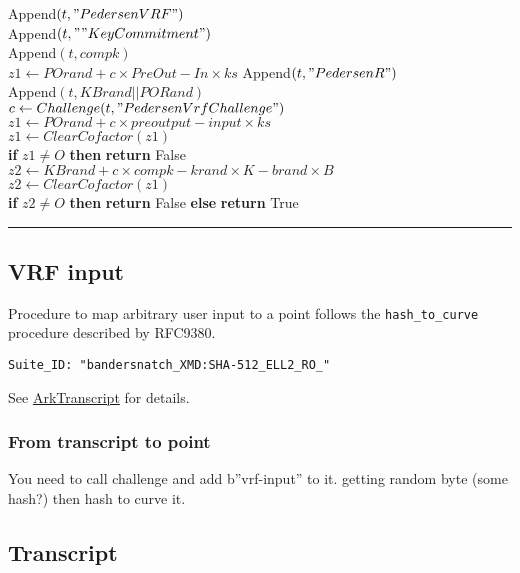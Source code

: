 \documentclass[
]{article}
\begin{document}
Append\((t, "PedersenVRF")\)\\
Append\((t, ""KeyCommitment")\)\\
Append\((t, compk)\)\\
\(z1 \leftarrow POrand + c \times PreOut - In \times ks\)
Append\((t, "Pedersen R")\)\\
Append\((t, KBrand || PORand)\)\\
\(c \leftarrow Challenge(t, "PedersenVrfChallenge")\)\\
\(z1 \leftarrow POrand + c \times preoutput - input \times ks\)\\
\(z1 \leftarrow ClearCofactor(z1)\)\\
\textbf{if} \(z1 \neq O\) \textbf{then} \textbf{return} False\\
\(z2 \leftarrow KBrand + c \times compk - krand \times K - brand \times B\)\\
\(z2 \leftarrow ClearCofactor(z1)\)\\
\textbf{if} \(z2 \neq O\) \textbf{then} \textbf{return} False
\textbf{else} \textbf{return} True

\begin{center}\rule{0.5\linewidth}{0.5pt}\end{center}

\hypertarget{vrf-input-1}{%
\subsection{VRF input}\label{vrf-input-1}}

Procedure to map arbitrary user input to a point follows the
\texttt{hash\_to\_curve} procedure described by RFC9380.

\begin{verbatim}
Suite_ID: "bandersnatch_XMD:SHA-512_ELL2_RO_"
\end{verbatim}

See \href{TODO}{ArkTranscript} for details.

\hypertarget{from-transcript-to-point}{%
\subsubsection{From transcript to
point}\label{from-transcript-to-point}}

You need to call challenge and add b''vrf-input'' to it. getting random
byte (some hash?) then hash to curve it.

\hypertarget{transcript}{%
\subsection{Transcript}\label{transcript}}
\end{document}
